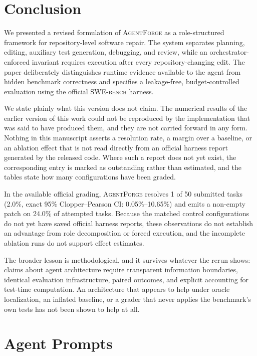 \documentclass[journal]{IEEEtran}
\newcommand{\agentforge}{\textsc{AgentForge}}
\newcommand{\swebench}{\textsc{SWE-bench}}
\begin{document}
\section{Conclusion}
\label{sec:conclusion}

We presented a revised formulation of \agentforge{} as a role-structured framework for repository-level software repair. The system separates planning, editing, auxiliary test generation, debugging, and review, while an orchestrator-enforced invariant requires execution after every repository-changing edit. The paper deliberately distinguishes runtime evidence available to the agent from hidden benchmark correctness and specifies a leakage-free, budget-controlled evaluation using the official \swebench{} harness.

We state plainly what this version does not claim. The numerical results of the earlier version of this work could not be reproduced by the implementation that was said to have produced them, and they are not carried forward in any form. Nothing in this manuscript asserts a resolution rate, a margin over a baseline, or an ablation effect that is not read directly from an official harness report generated by the released code. Where such a report does not yet exist, the corresponding entry is marked as outstanding rather than estimated, and the tables state how many configurations have been graded.

In the available official grading, \agentforge{} resolves 1 of 50 submitted tasks (2.0\%, exact 95\% Clopper--Pearson CI: 0.05\%--10.65\%) and emits a non-empty patch on 24.0\% of attempted tasks. Because the matched control configurations do not yet have saved official harness reports, these observations do not establish an advantage from role decomposition or forced execution, and the incomplete ablation runs do not support effect estimates.

The broader lesson is methodological, and it survives whatever the rerun shows: claims about agent architecture require transparent information boundaries, identical evaluation infrastructure, paired outcomes, and explicit accounting for test-time computation. An architecture that appears to help under oracle localization, an inflated baseline, or a grader that never applies the benchmark's own tests has not been shown to help at all.

\appendices

\section{Agent Prompts}
\label{app:prompts}
\end{document}
